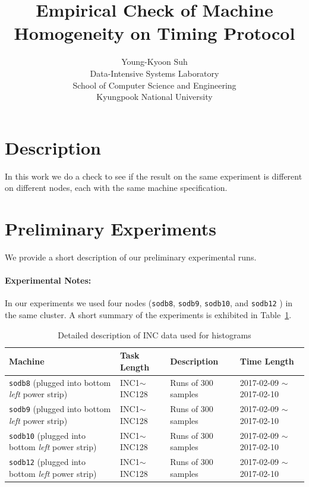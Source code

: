 \documentclass[10pt]{article}
\begin{document}
\title{Empirical Check of Machine Homogeneity on Timing Protocol}

\author{
Young-Kyoon Suh\\
Data-Intensive Systems Laboratory\\
School of Computer Science and Engineering\\
Kyungpook National University\\
}
\maketitle

\section{Description}
In this work we do a check to see if the result on the same experiment is different 
on different nodes, each with the same machine specification.

\section{Preliminary Experiments}

We provide a short description of our preliminary experimental runs. 

\paragraph{Experimental Notes:} In our experiments 
we used four nodes ({\tt sodb8}, {\tt sodb9}, {\tt sodb10}, and {\tt sodb12} ) in the same cluster. 
A short summary of the experiments is exhibited in Table~\ref{tab:exp_notes}.

\begin{table}[h]
\begin{center}
\begin{tabular}{|p{4cm}|p{3cm}|p{4cm}|p{4cm}|} \hline
Machine & Task Length & Description & Time Length\\ \hline
{\tt sodb8} (plugged into \hbox{bottom} {\em left} power strip) & INC1$\sim$INC128 & Runs of 300 samples & 2017-02-09 $\sim$ 2017-02-10\\ \hline
{\tt sodb9}  (plugged into \hbox{bottom} {\em left} power strip)  &  INC1$\sim$INC128 & Runs of 300 samples & 2017-02-09 $\sim$ 2017-02-10\\ \hline
{\tt sodb10}  (plugged into \hbox{bottom} {\em left} power strip)  & INC1$\sim$INC128 & Runs of 300 samples & 2017-02-09 $\sim$ 2017-02-10\\ \hline
{\tt sodb12}  (plugged into \hbox{bottom} {\em left} power strip)  & INC1$\sim$INC128 & Runs of 300 samples & 2017-02-09 $\sim$ 2017-02-10\\ \hline
\end{tabular}
\end{center}
\vspace{-.2in}
\caption{Detailed description of INC data used for histograms\label{tab:exp_notes}}
\end{table}
\end{document}

